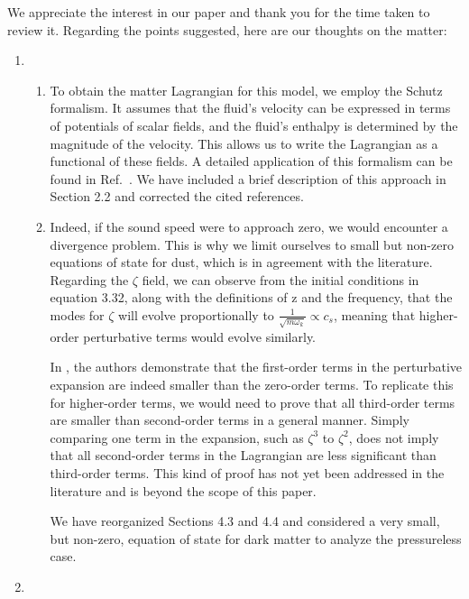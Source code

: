 \documentclass[a4paper,11pt]{article}
\begin{document}
We appreciate the interest in our paper and thank you for the time taken to review it. Regarding the points suggested, here are our thoughts on the matter:

\begin{enumerate}
    \item 

    \begin{enumerate}
        \item  To obtain the matter Lagrangian for this model, we employ the Schutz formalism. It assumes that the fluid's velocity can be expressed in terms of potentials of scalar fields, and the fluid's enthalpy is determined by the magnitude of the velocity. This allows us to write the Lagrangian as a functional of these fields. A detailed application of this formalism can be found in Ref.~\cite{fluidgeral}. We have included a brief description of this approach in Section 2.2 and corrected the cited references.

        \item Indeed, if the sound speed were to approach zero, we would encounter a divergence problem. This is why we limit ourselves to small but non-zero equations of state for dust, which is in agreement with the literature. Regarding the $\zeta$ field, we can observe from the initial conditions in equation 3.32, along with the definitions of 
        z and the frequency, that the modes for $\zeta$ will evolve proportionally to 
        $\frac{1}{\sqrt{m \omega_k}} \propto c_s$, meaning that higher-order perturbative terms would evolve similarly.

        In \cite{vitenti}, the authors demonstrate that the first-order terms in the perturbative expansion are indeed smaller than the zero-order terms. To replicate this for higher-order terms, we would need to prove that all third-order terms are smaller than second-order terms in a general manner. Simply comparing one term in the expansion, such as $\zeta^3$ to $\zeta^2$, does not imply that all second-order terms in the Lagrangian are less significant than third-order terms. This kind of proof has not yet been addressed in the literature and is beyond the scope of this paper.

        We have reorganized Sections 4.3 and 4.4 and considered a very small, but non-zero, equation of state for dark matter to analyze the pressureless case.
        
    \end{enumerate}

    \item 


\end{enumerate}
\end{document}
